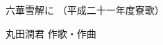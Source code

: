 \documentclass[10pt,b5j]{tarticle} %
\begin{document}
\begin{minipage}[c]{0.7\hsize} %
    \begin{center}
        {\LARGE
            六華雪解に %
        }
        {\small 
            （平成二十一年度寮歌） %
        }
    \end{center}
\end{minipage}
\begin{minipage}[c]{0.3\hsize} %
    \begin{flushright} %
        丸田潤君 作歌・作曲 %
    \end{flushright}
\end{minipage}
\end{document}
